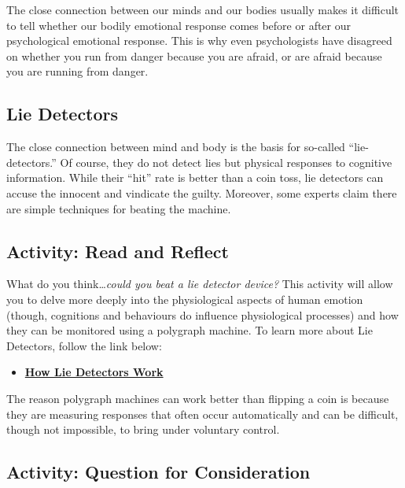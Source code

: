 \documentclass[
]{book}
\providecommand{\tightlist}{%
  \setlength{\itemsep}{0pt}\setlength{\parskip}{0pt}}
\begin{document}
The close connection between our minds and our bodies usually makes it difficult to tell whether our bodily emotional response comes before or after our psychological emotional response. This is why even psychologists have disagreed on whether you run from danger because you are afraid, or are afraid because you are running from danger.

\hypertarget{lie-detectors}{%
\subsection*{Lie Detectors}\label{lie-detectors}}

The close connection between mind and body is the basis for so-called ``lie-detectors.'' Of course, they do not detect lies but physical responses to cognitive information. While their ``hit'' rate is better than a coin toss, lie detectors can accuse the in­nocent and vindicate the guilty. Moreover, some experts claim there are simple techniques for beating the ma­chine.

\hypertarget{activity-read-and-reflect-12}{%
\subsection*{Activity: Read and Reflect}\label{activity-read-and-reflect-12}}

\begin{reflect}
What do you think\ldots{}\emph{could you beat a lie detector device?} This activity will allow you to delve more deeply into the physiological aspects of human emotion (though, cognitions and behaviours do influence physiological processes) and how they can be monitored using a polygraph machine. To learn more about Lie Detectors, follow the link below:

\begin{itemize}
\tightlist
\item
  \href{https://people.howstuffworks.com/lie-detector.htm}{\textbf{How Lie Detectors Work}}
\end{itemize}

The reason polygraph machines can work better than flipping a coin is because they are measuring responses that often occur automatically and can be difficult, though not impossible, to bring under voluntary control.
\end{reflect}

\hypertarget{activity-question-for-consideration-5}{%
\subsection*{Activity: Question for Consideration}\label{activity-question-for-consideration-5}}
\end{document}
